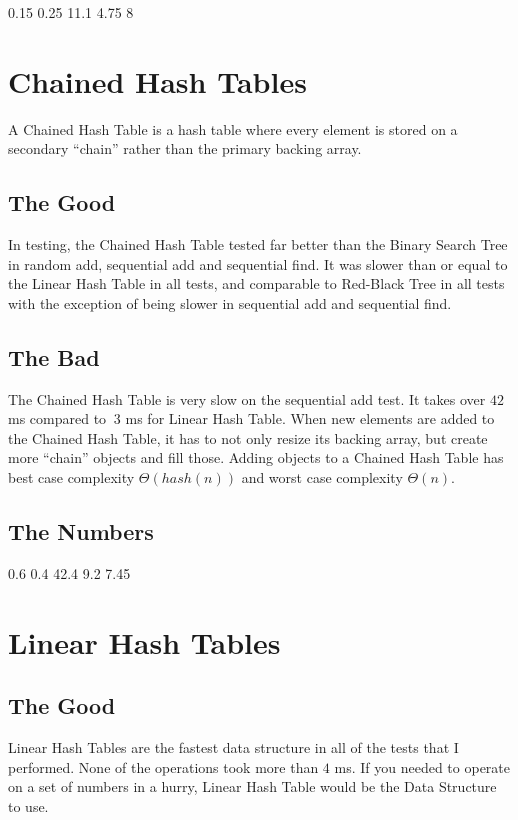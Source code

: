 \documentclass{muformallab}
\begin{document}
   {0.15} {0.25} {11.1} {4.75} {8}

  \section{Chained Hash Tables}

  A Chained Hash Table is a hash table where every element is stored on
  a secondary ``chain'' rather than the primary backing array.

  \subsection{The Good}

  In testing, the Chained Hash Table tested far better than the Binary
  Search Tree in random add, sequential add and sequential find. It was
  slower than or equal to the Linear Hash Table in all tests, and
  comparable to Red-Black Tree in all tests with the exception of being
  slower in sequential add and sequential find.

  \subsection{The Bad}

  The Chained Hash Table is very slow on the sequential add test. It takes
  over $42$ ms compared to $~3$ ms for Linear Hash Table. When new
  elements are added to the Chained Hash Table, it has to not only resize
  its backing array, but create more ``chain'' objects and fill those.
  Adding objects to a Chained Hash Table has best case complexity $\Theta
  \left( hash \left( n \right) \right)$ and worst case complexity $\Theta
  \left( n \right)$.

  \subsection{The Numbers}

   {0.6} {0.4} {42.4} {9.2} {7.45}

  \section{Linear Hash Tables}

  \subsection{The Good}

  Linear Hash Tables are the fastest data structure in all of the tests
  that I performed. None of the operations took more than $4$ ms. If you
  needed to operate on a set of numbers in a hurry, Linear Hash Table
  would be the Data Structure to use.
\end{document}
